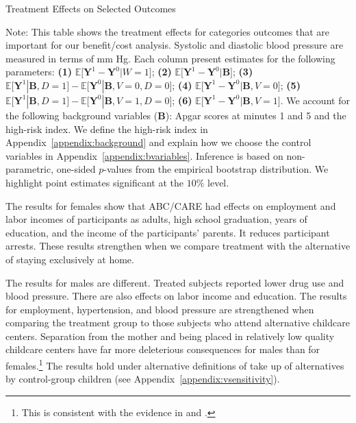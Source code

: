 \begin{table}[!htbp]
\centering
\begin{threeparttable}
\caption{Treatment Effects on Selected Outcomes}\label{table:tescombined}
\begin{scriptsize}

\end{scriptsize}
\begin{tablenotes}
\tiny
Note: This table shows the treatment effects for categories outcomes that are important for our benefit/cost analysis. Systolic and diastolic blood pressure are measured in terms of mm Hg. Each column present estimates for the following parameters: \textbf{(1)} $\mathbb{E} \big[ \bm{Y}^1 - \bm{Y}^0 | W = 1]$; {\textbf{(2)} $\mathbb{E} \big[ \bm{Y}^1 - \bm{Y}^0 | \bm{B} \big]$}; {\textbf{(3)} $\mathbb{E} \big[ \bm{Y}^1 | \bm{B}, D=1 \big] - \mathbb{E} \big[ \bm{Y}^0 | \bm{B}, V=0, D=0 \big]$}; {\textbf{(4)} $\mathbb{E} \big[ \bm{Y}^1 - \bm{Y}^0 | \bm{B}, V=0 \big] $}; {\textbf{(5)} $\mathbb{E} \big[ \bm{Y}^1 | \bm{B}, D=1 \big] - \mathbb{E} \big[ \bm{Y}^0 | \bm{B}, V=1, D = 0 \big]$}; {\textbf{(6)} $\mathbb{E} \big[ \bm{Y}^1 - \bm{Y}^0 | \bm{B}, V=1 \big]$}. We account for the following background variables ($\bm{B}$): Apgar scores at minutes 1 and 5 and the high-risk index. We define the high-risk index in Appendix~\ref{appendix:background} and explain how we choose the control variables in Appendix~\ref{appendix:bvariables}. Inference is based on non-parametric, one-sided $p$-values from the empirical bootstrap distribution. We highlight point estimates significant at the $10\%$ level.
\end{tablenotes}
\end{threeparttable}
\end{table}
\restoregeometry
\doublespacing

The results for females show that ABC/CARE had effects on employment and labor incomes of participants as adults, high school graduation, years of education, and the income of the participants' parents. It reduces participant arrests. These results strengthen when we compare treatment with the alternative of staying exclusively at home.

The results for males are different. Treated subjects reported lower drug use and blood pressure. There are also effects on labor income and education. The results for employment, hypertension, and blood pressure are strengthened when comparing the treatment group to those subjects who attend alternative childcare centers. Separation from the mother and being placed in relatively low quality childcare centers have far more deleterious consequences for males than for females.\footnote{This is consistent with the evidence in \citet{Baker_Gruber_Milligan_2015_Noncog_Defects} and \citet{Kottelenberg-Lehrer_2014_Gender-Effects}.} The results hold under alternative definitions of take up of alternatives by control-group children (see Appendix~\ref{appendix:vsensitivity}).

